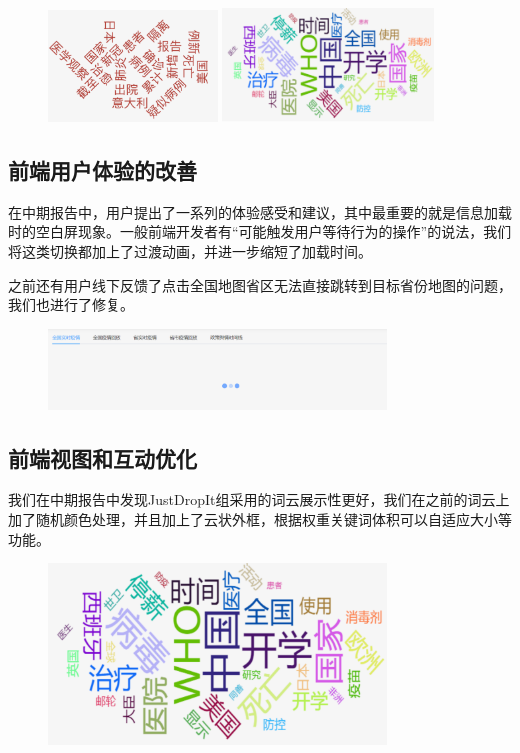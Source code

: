 \documentclass{article}
\begin{document}
\begin{figure}[H]
\centering
\includegraphics[width=0.4\textwidth]{word-old.png}
\includegraphics[width=0.5\textwidth]{word-new.png}
\end{figure}

\subsection{前端用户体验的改善}

在中期报告中，用户提出了一系列的体验感受和建议，其中最重要的就是信息加载时的空白屏现象。一般前端开发者有“可能触发用户等待行为的操作”的说法，我们将这类切换都加上了过渡动画，并进一步缩短了加载时间。

之前还有用户线下反馈了点击全国地图省区无法直接跳转到目标省份地图的问题，我们也进行了修复。

\begin{figure}[H]
\centering
\includegraphics[width=0.8\textwidth]{pic7.png}
\end{figure}

\subsection{前端视图和互动优化}

我们在中期报告中发现JustDropIt组采用的词云展示性更好，我们在之前的词云上加了随机颜色处理，并且加上了云状外框，根据权重关键词体积可以自适应大小等功能。


\begin{figure}[H]
\centering
\includegraphics[width=0.8\textwidth]{word-new.png}
\end{figure}
\end{document}

